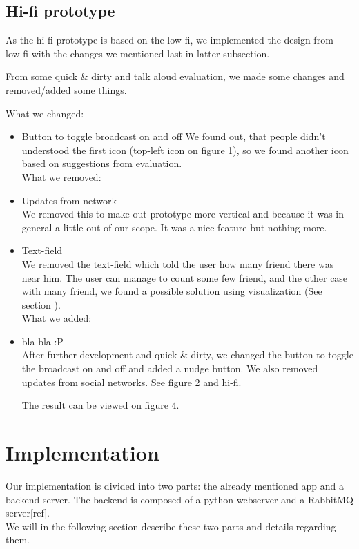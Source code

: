 \documentclass[runningheads,a4paper]{llncs}
\begin{document}
\subsection{Hi-fi prototype}

As the hi-fi prototype is based on the low-fi, we implemented the design from low-fi with the changes we mentioned last in latter subsection. 

From some quick \& dirty and talk aloud evaluation, we made some changes and removed/added some things. 

What we changed: 
\begin{itemize}
\item Button to toggle broadcast on and off
We found out, that people didn’t understood the first icon (top-left icon on figure 1), so we found another icon based on suggestions from evaluation. \\


What we removed:
\item Updates from network\\
We removed this to make out prototype more vertical and because it was in general a little out of our scope. It was a nice feature but nothing more. \\

\item Text-field\\
We removed the text-field which told the user how many friend there was near him. The user can manage to count some few friend, and the other case with many friend, we found a possible solution using visualization (See section ). \\

What we added: 
\item bla bla :P \\
After further development and quick \& dirty, we changed the button to toggle the broadcast on and off and added a nudge button. We also removed updates from social networks. See figure 2 and hi-fi. 

The result can be viewed on figure 4. 


\end{itemize}

\section{Implementation}
Our implementation is divided into two parts: the already mentioned app and a backend server. The backend is composed of a python webserver and a RabbitMQ server[ref]. \\
We will in the following section describe these two parts and details regarding them. 
\end{document}
